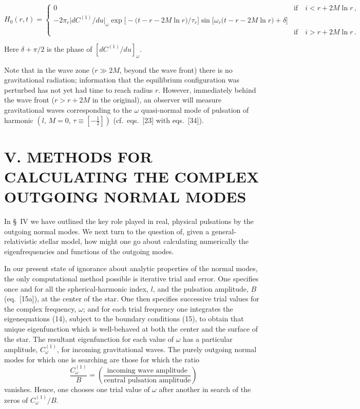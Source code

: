 
\begin{equation}
H_0(r,t) =
\begin{cases}
0 & \text{if} \quad i < r + 2M \ln r \,, \\[6pt]
-2\pi_r \bigl|dC^{(1)}/du\bigr|_{\omega} \exp\bigl[-\bigl(t - r - 2M\ln r\bigr)/\tau_r\bigr]
\sin\bigl[\omega_r\bigl(t - r - 2M\ln r\bigr) + \delta\bigr] & \\[2pt]
& \text{if} \quad i > r + 2M \ln r \,.
\end{cases}
\tag{34b}
\end{equation}

Here $\delta + \pi/2$ is the phase of $[dC^{(1)}/du]_{\omega}$.

Note that in the wave zone ($r \gg 2M$, beyond the wave front) there is no gravitational radiation; information that the equilibrium configuration was perturbed has not yet had time to reach radius $r$. However, immediately behind the wave front ($r > r + 2M$ in the original), an observer will measure gravitational waves corresponding to the $\omega$ quasi-normal mode of pulsation of harmonic $(l,\, M = 0,\, \tau \equiv [-\frac{1}{2}])$ (cf.\ eqs.\ [23] with eqs.\ [34]).

\section*{V. METHODS FOR CALCULATING THE COMPLEX OUTGOING NORMAL MODES}

In \S~IV we have outlined the key role played in real, physical pulsations by the outgoing normal modes. We next turn to the question of, given a general-relativistic stellar model, how might one go about calculating numerically the eigenfrequencies and functions of the outgoing modes.

In our present state of ignorance about analytic properties of the normal modes, the only computational method possible is iterative trial and error. One specifies once and for all the spherical-harmonic index, $l$, and the pulsation amplitude, $B$ (eq.\ [15a]), at the center of the star. One then specifies successive trial values for the complex frequency, $\omega$; and for each trial frequency one integrates the eigenequations (14), subject to the boundary conditions (15), to obtain that unique eigenfunction which is well-behaved at both the center and the surface of the star. The resultant eigenfunction for each value of $\omega$ has a particular amplitude, $C_\omega^{(1)}$, for incoming gravitational waves. The purely outgoing normal modes for which one is searching are those for which the ratio
%
\begin{equation}
\frac{C_\omega^{(1)}}{B} =
\left(\frac{\text{incoming wave amplitude}}{\text{central pulsation amplitude}}\right)
\tag{35}
\end{equation}
%
vanishes. Hence, one chooses one trial value of $\omega$ after another in search of the zeros of $C_\omega^{(1)}/B$.

